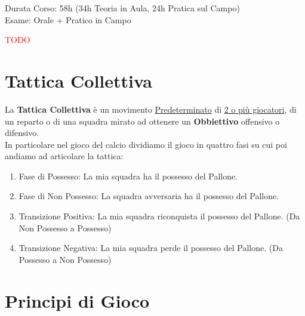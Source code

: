 \documentclass[../uefaC.tex]{subfiles}
\begin{document}

Durata Corso: 58h (34h Teoria in Aula, 24h Pratica sul Campo) \hfill \\
Esame: Orale + Pratico in Campo

\textcolor{red}{TODO}

\section{Tattica Collettiva}

La \textbf{Tattica Collettiva} è un movimento \underline{Predeterminato} di \underline{2 o più giocatori}, di un reparto o di una squadra mirato ad ottenere un \textbf{Obbiettivo} offensivo o difensivo. \hfill \\
In particolare nel gioco del calcio dividiamo il gioco in quattro fasi su cui poi andiamo ad articolare la tattica:
\begin{enumerate}
    \item{Fase di Possesso}: La mia squadra ha il possesso del Pallone.
    \item{Fase di Non Possesso}: La squadra avversaria ha il possesso del Pallone.
    \item{Transizione Positiva}: La mia squadra riconquista il possesso del Pallone. (Da Non Possesso a Possesso)
    \item{Transizione Negativa}: La mia squadra perde il possesso del Pallone. (Da Possesso a Non Possesso)
\end{enumerate}

\section{Principi di Gioco}
\end{document}
